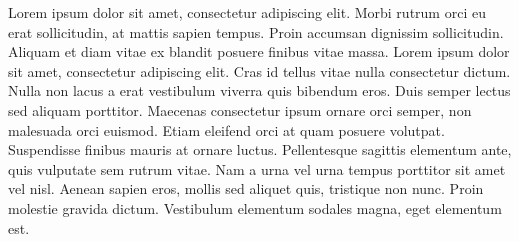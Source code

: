\documentclass{uc3mpracticas}
\begin{document}
  Lorem ipsum dolor sit amet, consectetur adipiscing elit. Morbi rutrum orci eu erat sollicitudin, at mattis sapien tempus. Proin accumsan dignissim sollicitudin. Aliquam et diam vitae ex blandit posuere finibus vitae massa. Lorem ipsum dolor sit amet, consectetur adipiscing elit. Cras id tellus vitae nulla consectetur dictum. Nulla non lacus a erat vestibulum viverra quis bibendum eros. Duis semper lectus sed aliquam porttitor. Maecenas consectetur ipsum ornare orci semper, non malesuada orci euismod. Etiam eleifend orci at quam posuere volutpat. Suspendisse finibus mauris at ornare luctus. Pellentesque sagittis elementum ante, quis vulputate sem rutrum vitae. Nam a urna vel urna tempus porttitor sit amet vel nisl. Aenean sapien eros, mollis sed aliquet quis, tristique non nunc. Proin molestie gravida dictum. Vestibulum elementum sodales magna, eget elementum est.
\end{document}

